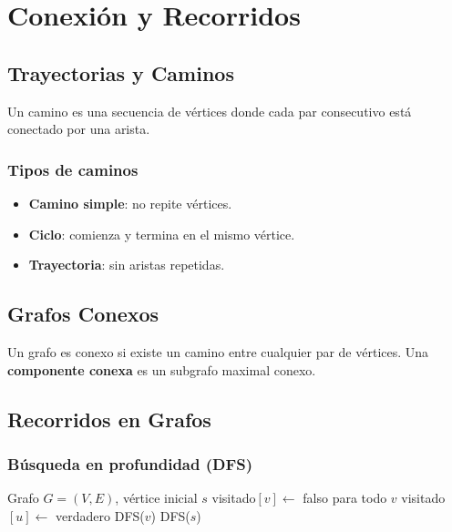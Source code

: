 \chapter{Conexión y Recorridos}

\section{Trayectorias y Caminos}
Un camino es una secuencia de vértices donde cada par consecutivo está conectado por una arista.

\subsection{Tipos de caminos}
\begin{itemize}
  \item \textbf{Camino simple}: no repite vértices.
  \item \textbf{Ciclo}: comienza y termina en el mismo vértice.
  \item \textbf{Trayectoria}: sin aristas repetidas.
\end{itemize}

\section{Grafos Conexos}
Un grafo es conexo si existe un camino entre cualquier par de vértices. Una \textbf{componente conexa} es un subgrafo maximal conexo.

\section{Recorridos en Grafos}

\subsection{Búsqueda en profundidad (DFS)}

\begin{algorithm}[htbp]
\caption{DFS}
\begin{algorithmic}[1]
\Require Grafo $G=(V,E)$, vértice inicial $s$
\State visitado$[v] \gets$ falso para todo $v$
  \State visitado$[u] \gets$ verdadero
      \State DFS($v$)
    \EndIf
  \EndFor
\EndProcedure
\State DFS($s$)
\end{algorithmic}
\end{algorithm}


